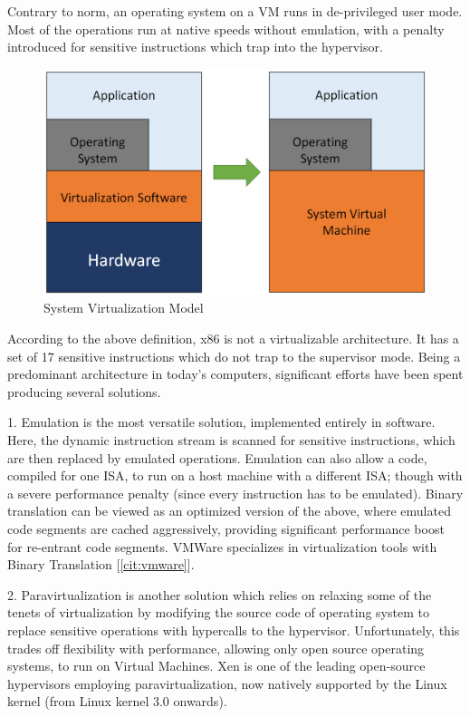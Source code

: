Contrary to norm, an operating system on a VM runs in de-privileged user mode. Most of the operations run at native speeds without emulation, with a penalty introduced for sensitive instructions which trap into the hypervisor.

\setlength{\belowcaptionskip}{-10pt}

\begin{figure}[H]
  \centering
  \includegraphics[scale=0.6]{figures/sys_virt.png}
  \caption{System Virtualization Model}
  \label{fig:sys_virt}
\end{figure}

According to the above definition, x86 is not a virtualizable architecture. It has a set of 17 sensitive instructions which do not trap to the supervisor mode. Being a predominant architecture in today’s computers, significant efforts have been spent producing several solutions.

1. Emulation is the most versatile solution, implemented entirely in software. Here, the dynamic instruction stream is scanned for sensitive instructions, which are then replaced by emulated operations. Emulation can also allow a code, compiled for one ISA, to run on a host machine with a different ISA; though with a severe performance penalty (since every instruction has to be emulated). Binary translation can be viewed as an optimized version of the above, where emulated code segments are cached aggressively, providing significant performance boost for re-entrant code segments. VMWare specializes in virtualization tools with Binary Translation [\ref{cit:vmware}].

2. Paravirtualization is another solution which relies on relaxing some of the tenets of virtualization by modifying the source code of operating system to replace sensitive operations with hypercalls to the hypervisor. Unfortunately, this trades off flexibility with performance, allowing only open source operating systems, to run on Virtual Machines. Xen is one of the leading open-source hypervisors employing paravirtualization, now natively supported by the Linux kernel (from Linux kernel 3.0 onwards).

